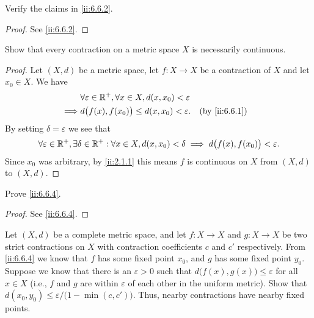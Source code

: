 \begin{ex}\label{ii:ex:6.6.5}
  Verify the claims in \cref{ii:6.6.2}.
\end{ex}

\begin{proof}
  See \cref{ii:6.6.2}.
\end{proof}

\begin{ex}\label{ii:ex:6.6.6}
  Show that every contraction on a metric space \(X\) is necessarily continuous.
\end{ex}

\begin{proof}
  Let \((X, d)\) be a metric space, let \(f : X \to X\) be a contraction of \(X\) and let \(x_0 \in X\).
  We have
  \begin{align*}
             & \forall \varepsilon \in \R^+, \forall x \in X, d(x, x_0) < \varepsilon                    \\
    \implies & d\big(f(x), f(x_0)\big) \leq d(x, x_0) < \varepsilon.                  &  & \by{ii:6.6.1}
  \end{align*}
  By setting \(\delta = \varepsilon\) we see that
  \[
    \forall \varepsilon \in \mathbb{R}^+, \exists \delta \in \mathbb{R}^+ : \forall x \in X, d(x, x_0) < \delta \implies d\big(f(x), f(x_0)\big) < \varepsilon.
  \]
  Since \(x_0\) was arbitrary, by \cref{ii:2.1.1} this means \(f\) is continuous on \(X\) from \((X, d)\) to \((X, d)\).
\end{proof}

\begin{ex}\label{ii:ex:6.6.7}
  Prove \cref{ii:6.6.4}.
\end{ex}

\begin{proof}
  See \cref{ii:6.6.4}.
\end{proof}

\begin{ex}\label{ii:ex:6.6.8}
  Let \((X, d)\) be a complete metric space, and let \(f : X \to X\) and \(g : X \to X\) be two strict contractions on \(X\) with contraction coefficients \(c\) and \(c'\) respectively.
  From \cref{ii:6.6.4} we know that \(f\) has some fixed point \(x_0\), and \(g\) has some fixed point \(y_0\).
  Suppose we know that there is an \(\varepsilon > 0\) such that \(d\big(f(x), g(x)\big) \leq \varepsilon\) for all \(x \in X\)
  (i.e., \(f\) and \(g\) are within \(\varepsilon\) of each other in the uniform metric).
  Show that \(d(x_0, y_0) \leq \varepsilon / \big(1 - \min(c, c')\big)\).
  Thus, nearby contractions have nearby fixed points.
\end{ex}

